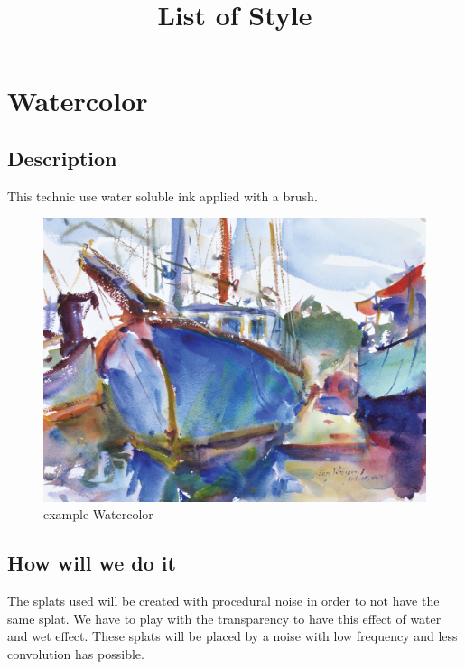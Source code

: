\documentclass[12pt]{article}
\title{List of Style}
\begin{document}
\maketitle



\section{Watercolor}

\subsection*{Description}

This technic use water soluble ink applied with a brush.

\begin{figure}[!ht]
    \begin{center}
        \includegraphics[scale=0.1]{image/watercolor.jpg}
        \caption{example Watercolor}
    \end{center}
\end{figure}

\subsection*{How will we do it}

The splats used will be created with procedural noise in order to not have the same splat. We have to play with the transparency to have this effect of water and wet effect. These splats will be placed by a noise with low frequency and less convolution has possible.
\end{document}
